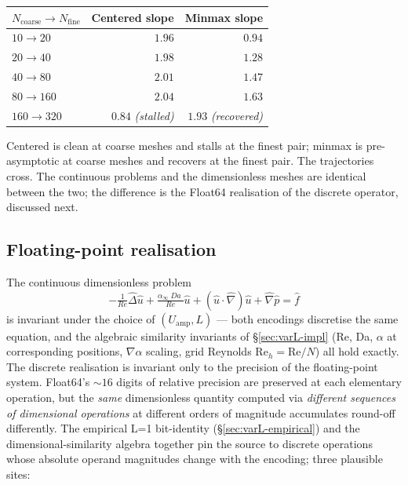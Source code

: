 \documentclass[11pt]{article}
\newcommand{\Reyn}{\operatorname{\mathit{Re}}}
\newcommand{\Damk}{\operatorname{\mathit{Da}}}
\begin{document}
\begin{center}
\begin{tabular}{lrr}
  \toprule
  $N_{\text{coarse}} \to N_{\text{fine}}$ & Centered slope & Minmax slope \\
  \midrule
  $10 \to 20$   & $1.96$ & $0.94$ \\
  $20 \to 40$   & $1.98$ & $1.28$ \\
  $40 \to 80$   & $2.01$ & $1.47$ \\
  $80 \to 160$  & $2.04$ & $1.63$ \\
  $160 \to 320$ & $\mathbf{0.84}$ \emph{(stalled)} & $\mathbf{1.93}$ \emph{(recovered)} \\
  \bottomrule
\end{tabular}
\end{center}

\noindent Centered is clean at coarse meshes and stalls at the finest
pair; minmax is pre-asymptotic at coarse meshes and recovers at the
finest pair. The trajectories cross. The continuous problems and the
dimensionless meshes are identical between the two; the difference is
the Float64 realisation of the discrete operator, discussed next.

\subsection{Floating-point realisation}
\label{sec:varL-fp}

The continuous dimensionless problem
\begin{equation}
  -\tfrac{1}{\Reyn} \widehat{\Delta} \hat{u}
  + \tfrac{\alpha_\infty \Damk}{\Reyn} \hat{u}
  + (\hat{u} \cdot \widehat{\nabla}) \hat{u}
  + \widehat{\nabla} \hat{p}
  = \hat{f}
  \label{eq:dimless-ns}
\end{equation}
is invariant under the choice of $(U_{\text{amp}}, L)$ — both encodings
discretise the same equation, and the algebraic similarity invariants
of §\ref{sec:varL-impl} (Re, Da, $\alpha$ at corresponding positions,
$\nabla\alpha$ scaling, grid Reynolds $\mathrm{Re}_h = \mathrm{Re}/N$)
all hold exactly. The discrete realisation is invariant only to the
precision of the floating-point system. Float64's $\sim 16$ digits of
relative precision are preserved at each elementary operation, but the
\emph{same} dimensionless quantity computed via \emph{different
sequences of dimensional operations} at different orders of magnitude
accumulates round-off differently. The empirical L=1 bit-identity
(§\ref{sec:varL-empirical}) and the dimensional-similarity algebra
together pin the source to discrete operations whose absolute operand
magnitudes change with the encoding; three plausible sites:
\end{document}
